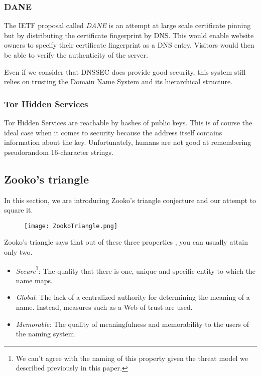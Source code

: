 \documentclass{vldb}
\begin{document}
\subsubsection{DANE}

The IETF proposal called \emph{DANE} is an attempt at large scale certificate pinning but by distributing the certificate fingerprint by DNS. This would enable website owners to specify their certificate fingerprint as a DNS entry. Visitors would then be able to verify the authenticity of the server.

Even if we consider that DNSSEC does provide good security, this system still relies on trusting the Domain Name System and its hierarchical structure.

\subsubsection{Tor Hidden Services}

Tor Hidden Services are reachable by hashes of public keys. This is of course the ideal case when it comes to security because the address itself contains information about the key. Unfortunately, humans are not good at remembering pseudorandom 16-character strings.

\subsection{Zooko's triangle}
In this section, we are introducing Zooko's triangle conjecture and our attempt to square it.

\begin{figure}[h!]
\centering
\texttt{[image: ZookoTriangle.png]}
\end{figure}

Zooko's triangle says that out of these three properties \cite{zookoTriangleWikipedia}, you can usually attain only two.
\begin{itemize}
\item \emph{Secure}\footnote{We can't agree with the naming of this property given the threat model we described previously in this paper.}: The quality that there is one, unique and specific entity to which the name maps.
\item \emph{Global}: The lack of a centralized authority for determining the meaning of a name. Instead, measures such as a Web of trust are used.
\item \emph{Memorable}: The quality of meaningfulness and memorability to the users of the naming system.
\end{itemize}
\end{document}
